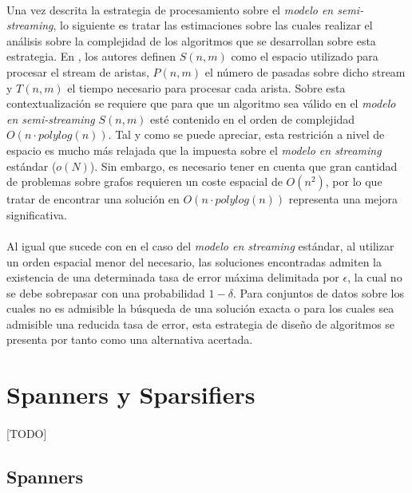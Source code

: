 \documentclass{subfiles}
\begin{document}
      \paragraph{}
      Una vez descrita la estrategia de procesamiento sobre el \emph{modelo en semi-streaming}, lo siguiente es tratar las estimaciones sobre las cuales realizar el análisis sobre la complejidad de los algoritmos que se desarrollan sobre esta estrategia. En \cite{feigenbaum2005graph}, los autores definen $S(n,m)$ como el espacio utilizado para procesar el stream de aristas, $P(n,m)$ el número de pasadas sobre dicho stream y $T(n,m)$ el tiempo necesario para procesar cada arista. Sobre esta contextualización se requiere que para que un algoritmo sea válido en el \emph{modelo en semi-streaming} $S(n,m)$ esté contenido en el orden de complejidad $O(n \cdot polylog(n))$. Tal y como se puede apreciar, esta restrición a nivel de espacio es mucho más relajada que la impuesta sobre el \emph{modelo en streaming} estándar ($o(N)$). Sin embargo, es necesario tener en cuenta que gran cantidad de problemas sobre grafos requieren un coste espacial de $O(n^2)$, por lo que tratar de encontrar una solución en $O(n \cdot polylog(n))$ representa una mejora significativa.

      \paragraph{}
      Al igual que sucede con en el caso del \emph{modelo en streaming} estándar, al utilizar un orden espacial menor del necesario, las soluciones encontradas admiten la existencia de una determinada tasa de error máxima delimitada por $\epsilon$, la cual no se debe sobrepasar con una probabilidad $1-\delta$. Para conjuntos de datos sobre los cuales no es admisible la búsqueda de una solución exacta o para los cuales sea admisible una reducida tasa de error, esta estrategia de diseño de algoritmos se presenta por tanto como una alternativa acertada.

    \section{Spanners y Sparsifiers}
    \label{sec:spanners_sparsifiers}

      \paragraph{}
      [TODO]

      \subsection{Spanners}
      \label{sec:spanners}
\end{document}
